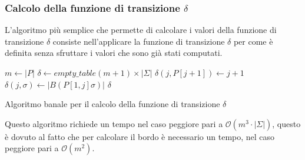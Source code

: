 \subsubsection{Calcolo della funzione di transizione $\delta$}
L'algoritmo più semplice che permette di calcolare i valori della funzione di
transizione $\delta$ consiste nell'applicare la funzione di transizione $\delta$
per come è definita senza sfruttare i valori che sono già stati computati.
\begin{algorithm}
    \begin{algorithmic}
        \State $m \gets |P|$
        \State $\delta \gets empty\_table (m + 1) \times | \Sigma|$
        \State $\delta(j, P[j + 1]) \gets j + 1$
        \EndFor
        \For{$\sigma \in \Sigma$}
        \State $\delta(j, \sigma) \gets |B(P[1, j]\sigma)|$
        \EndFor
        \EndFor
        \State \Return $\delta$
        \EndFunction
    \end{algorithmic}
    \caption{Algoritmo banale per il calcolo della funzione di transizione $\delta$}
\end{algorithm}

Questo algoritmo richiede un tempo nel caso peggiore pari a $\mathcal{O}(m^3 \cdot
    |\Sigma|)$, questo è dovuto al fatto che per calcolare il bordo è necessario
un tempo, nel caso peggiore pari a $\mathcal{O}(m^2)$.

